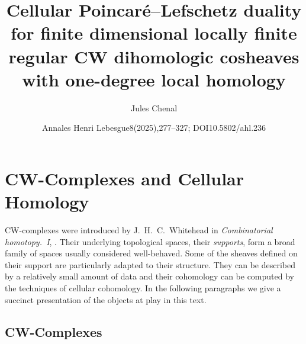 \documentclass[10pt]{amsart}
\title[Cellular Poincaré--Lefschetz duality]{Cellular Poincaré--Lefschetz duality for finite dimensional locally finite regular CW dihomologic cosheaves with one-degree local homology}
\author{Jules Chenal}
\date{Annales Henri Lebesgue8(2025),277–327; DOI10.5802/ahl.236}
\theoremstyle{definition}
\numberwithin{equation}{section}
\numberwithin{figure}{section}
\begin{document}
\maketitle
\setcounter{section}{1}
\section{CW-Complexes and Cellular Homology}

CW-complexes were introduced by J.~H.~C.~Whitehead in \emph{Combinatorial homotopy.~{I}}, \cite{Whi_com_hom}. Their underlying topological spaces, their \emph{supports}, form a broad family of spaces usually considered well-behaved. Some of the sheaves defined on their support are particularly adapted to their structure. They can be described by a relatively small amount of data and their cohomology can be computed by the techniques of cellular cohomology. In the following paragraphs we give a succinct presentation of the objects at play in this text.

\subsection{CW-Complexes}
\end{document}

